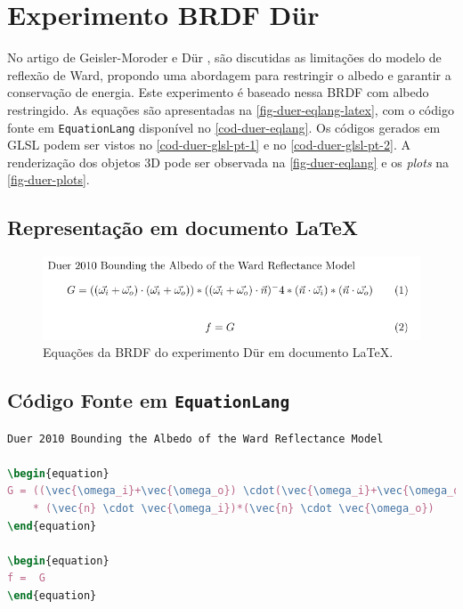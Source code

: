\section{Experimento BRDF Dür}
\label{section-experiment-duer}

No artigo de Geisler-Moroder e Dür \cite{duer2010bounding}, são discutidas as limitações do modelo de reflexão de Ward, propondo uma abordagem para restringir o albedo e garantir a conservação de energia. Este experimento é baseado nessa BRDF com albedo restringido. As equações são apresentadas na \autoref{fig-duer-eqlang-latex}, com o código fonte em \texttt{EquationLang} disponível no \autoref{cod-duer-eqlang}. Os códigos gerados em GLSL podem ser vistos no \autoref{cod-duer-glsl-pt-1} e no \autoref{cod-duer-glsl-pt-2}. A renderização dos objetos 3D pode ser observada na \autoref{fig-duer-eqlang} e os \textit{plots} na \autoref{fig-duer-plots}.

\subsection{Representação em documento \LaTeX{}}
\begin{figure}[H]
    \caption{\label{fig-duer-eqlang-latex} \small Equações da BRDF do experimento Dür em documento \LaTeX{}.}
    \begin{center}
        \includegraphics[scale=0.92]{./Imagens/brdfs/duer.pdf}
    \end{center}
\end{figure}

\subsection{Código Fonte em \texttt{EquationLang}}
\begin{codigo}[H]
    \caption{\small Código fonte da BRDF do experimento Dür.}
    \label{cod-duer-eqlang}
\begin{lstlisting}[language=tex, frame=none, inputencoding=utf8]
Duer 2010 Bounding the Albedo of the Ward Reflectance Model

\begin{equation}
G = ((\vec{\omega_i}+\vec{\omega_o}) \cdot(\vec{\omega_i}+\vec{\omega_o})) * ((\vec{\omega_i}+\vec{\omega_o}) \cdot \vec{n})^-4
    * (\vec{n} \cdot \vec{\omega_i})*(\vec{n} \cdot \vec{\omega_o})
\end{equation}

\begin{equation}
f =  G
\end{equation}
\end{lstlisting}
\end{codigo}

